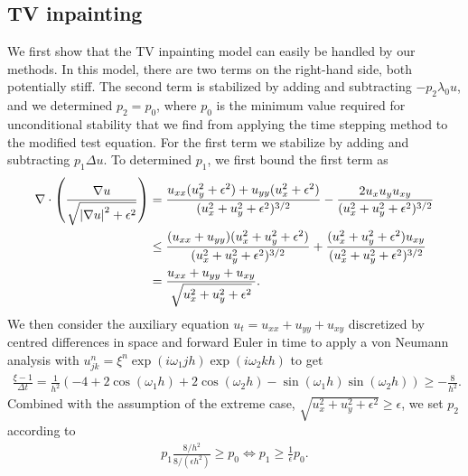 \subsection{TV inpainting}
We first show that the TV inpainting model can easily be handled by our methods. In this model, there are two terms on the right-hand side, both potentially stiff.  The second term is stabilized by adding and subtracting $-p_2\lambda_0 u$, and we determined $p_2=p_0$, where $p_0$ is the minimum value required for unconditional stability that we find from applying the time stepping method to the modified test equation. For the first term we stabilize by adding and subtracting $p_1\Delta u$. To determined $p_1$, we first bound the first term as 
\begin{align}
\begin{split}
        \nabla \cdot \left(\frac{\nabla u}{\sqrt{\left|\nabla u\right|^2 + \epsilon^2}} \right) 
&= \frac{u_{xx}(u_y^2 + \epsilon^2) + u_{yy}(u_x^2 + \epsilon^2)}{(u_x^2 + u_y^2 + \epsilon^2)^{3/2}} 
- \frac{2u_xu_y u_{xy}}{(u_x^2 + u_y^2 + \epsilon^2)^{3/2}} 
\\
&\leq \frac{(u_{xx}+u_{yy})(u_x^2 + u_y^2 + \epsilon^2)}{(u_x^2 + u_y^2 + \epsilon^2)^{3/2}} + \frac{(u_x^2 + u_y^2 + \epsilon^2)u_{xy}}{(u_x^2 + u_y^2 + \epsilon^2)^{3/2}}  
\\
&= \frac{u_{xx} + u_{yy} + u_{xy}}{\sqrt{u_x^2 + u_y^2 + \epsilon^2}}.
\end{split}
\label{p1 estimate inpaint 1}
\end{align}
We then consider the auxiliary equation $u_t = u_{xx} + u_{yy} + u_{xy}$ discretized by centred differences in space and forward Euler in time to apply a von Neumann analysis with $u^n_{jk} = \xi^n \exp(i\omega_1jh)\exp(i\omega_2kh)$ to get 
\begin{align}
        \frac{\xi  - 1}{\Delta t} 
= \frac{1}{h^2}(-4 + 2\cos(\omega_1 h) + 2\cos(\omega_2 h) - \sin(\omega_1 h)\sin(\omega_2h))
\geq -\frac{8}{h^2}.
\label{p1 estimate inpaint 2}
\end{align}
Combined with the assumption of the extreme case, $\sqrt{u_x^2 + u_y^2 + \epsilon^2} \geq \epsilon$, we set $p_2$ according to 
\begin{align}
        p_1\frac{8/h^2}{8/(\epsilon h^2)} \geq p_0 \iff 
p_1 \geq \frac{1}{\epsilon}p_0.
\end{align}

